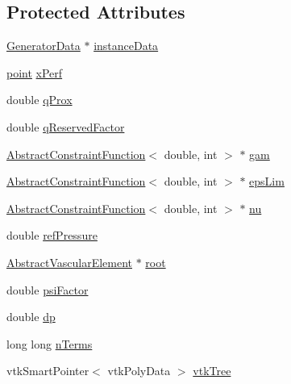 \subsection*{Protected Attributes}
\begin{DoxyCompactItemize}
\item 
\hyperlink{class_generator_data}{Generator\+Data} $\ast$ \hyperlink{class_abstract_object_c_c_o_tree_aca7aecbd89dadc46dd9dce14cfde31e1}{instance\+Data}
\item 
\hyperlink{structpoint}{point} \hyperlink{class_abstract_object_c_c_o_tree_a6b9a8b8d2ba28beba61fe94f9028767c}{x\+Perf}
\item 
double \hyperlink{class_abstract_object_c_c_o_tree_a95cecfb158b008159b0885e4f434046f}{q\+Prox}
\item 
double \hyperlink{class_abstract_object_c_c_o_tree_aa7724194ea9aaa23352a459feaa8c38f}{q\+Reserved\+Factor}
\item 
\hyperlink{class_abstract_constraint_function}{Abstract\+Constraint\+Function}$<$ double, int $>$ $\ast$ \hyperlink{class_abstract_object_c_c_o_tree_aad315b93744637e18153c4434dac067d}{gam}
\item 
\hyperlink{class_abstract_constraint_function}{Abstract\+Constraint\+Function}$<$ double, int $>$ $\ast$ \hyperlink{class_abstract_object_c_c_o_tree_a62d3e1ff7e74a6236422273f58fc6012}{eps\+Lim}
\item 
\hyperlink{class_abstract_constraint_function}{Abstract\+Constraint\+Function}$<$ double, int $>$ $\ast$ \hyperlink{class_abstract_object_c_c_o_tree_a92e6b6d1a2fac7331eee34fb28158828}{nu}
\item 
double \hyperlink{class_abstract_object_c_c_o_tree_ae7215e6237e4d04625a0c96be9f3578d}{ref\+Pressure}
\item 
\hyperlink{class_abstract_vascular_element}{Abstract\+Vascular\+Element} $\ast$ \hyperlink{class_abstract_object_c_c_o_tree_ae1b17938ad34d92629915159c49bb89a}{root}
\item 
double \hyperlink{class_abstract_object_c_c_o_tree_ad29145c32f075e9c9db3cf1bd2a97b28}{psi\+Factor}
\item 
double \hyperlink{class_abstract_object_c_c_o_tree_adfeb609a44be72e7894d09149ed40f3c}{dp}
\item 
long long \hyperlink{class_abstract_object_c_c_o_tree_ad6c998c6ee999126718ca75cf7eeea0e}{n\+Terms}
\item 
vtk\+Smart\+Pointer$<$ vtk\+Poly\+Data $>$ \hyperlink{class_abstract_object_c_c_o_tree_a241465d780d31882e94993abc0acb3af}{vtk\+Tree}

\end{DoxyCompactItemize}
